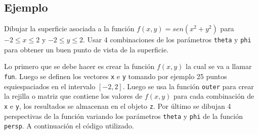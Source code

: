 \documentclass[10pt,]{krantz}
\begin{document}
\subsection*{Ejemplo}\label{ejemplo-15}


Dibujar la superficie asociada a la función \(f(x, y)=sen(x^2+y^2)\)
para \(-2 \leq x \leq2\) y \(-2 \leq y \leq2\). Usar 4 combinaciones de
los parámetros \texttt{theta} y \texttt{phi} para obtener un buen punto
de vista de la superficie.

Lo primero que se debe hacer es crear la función \(f(x, y)\) la cual se
va a llamar \texttt{fun}. Luego se definen los vectores \texttt{x} e
\texttt{y} tomando por ejemplo 25 puntos equiespaciados en el intervalo
\([-2, 2]\). Luego se usa la función \texttt{outer} para crear la
rejilla o matriz que contiene los valores de \(f(x, y)\) para cada
combinación de \texttt{x} e \texttt{y}, los resultados se almacenan en
el objeto \texttt{z}. Por último se dibujan 4 perspectivas de la función
variando los parámetros \texttt{theta} y \texttt{phi} de la función
\texttt{persp}. A continuación el código utilizado.
\end{document}
